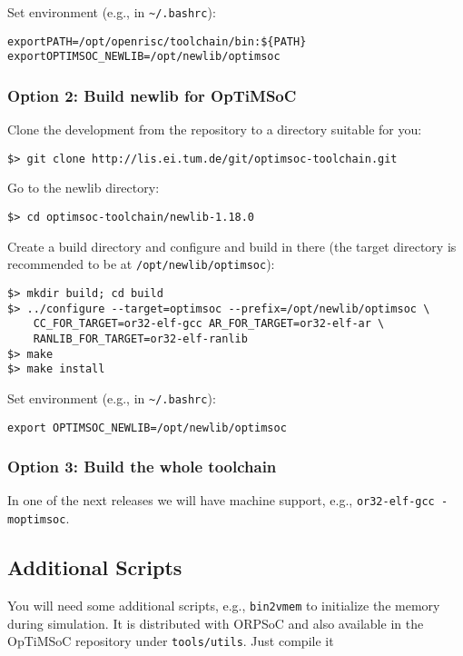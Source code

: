 Set environment (e.g., in \verb|~/.bashrc|):

\begin{alltt}
export PATH=/opt/openrisc/toolchain/bin:\$\{PATH\}
export OPTIMSOC_NEWLIB=/opt/newlib/optimsoc
\end{alltt}

\subsubsection{Option 2: Build newlib for OpTiMSoC}

Clone the development from the repository to a directory suitable for
you:

\begin{verbatim}
$> git clone http://lis.ei.tum.de/git/optimsoc-toolchain.git
\end{verbatim}

Go to the newlib directory:

\begin{verbatim}
$> cd optimsoc-toolchain/newlib-1.18.0
\end{verbatim}

Create a build directory and configure and build in there (the target
directory is recommended to be at \verb|/opt/newlib/optimsoc|):

\begin{verbatim}
$> mkdir build; cd build
$> ../configure --target=optimsoc --prefix=/opt/newlib/optimsoc \
    CC_FOR_TARGET=or32-elf-gcc AR_FOR_TARGET=or32-elf-ar \
    RANLIB_FOR_TARGET=or32-elf-ranlib
$> make
$> make install
\end{verbatim}

Set environment (e.g., in \verb|~/.bashrc|):

\begin{verbatim}
export OPTIMSOC_NEWLIB=/opt/newlib/optimsoc
\end{verbatim}


\subsubsection{Option 3: Build the whole toolchain}

In one of the next releases we will have machine support, e.g.,
\verb|or32-elf-gcc -moptimsoc|.

\subsection{Additional Scripts}
You will need some additional scripts, e.g., \verb|bin2vmem| to
initialize the memory during simulation. It is distributed with ORPSoC
and also available in the OpTiMSoC repository under
\verb|tools/utils|. Just compile it


